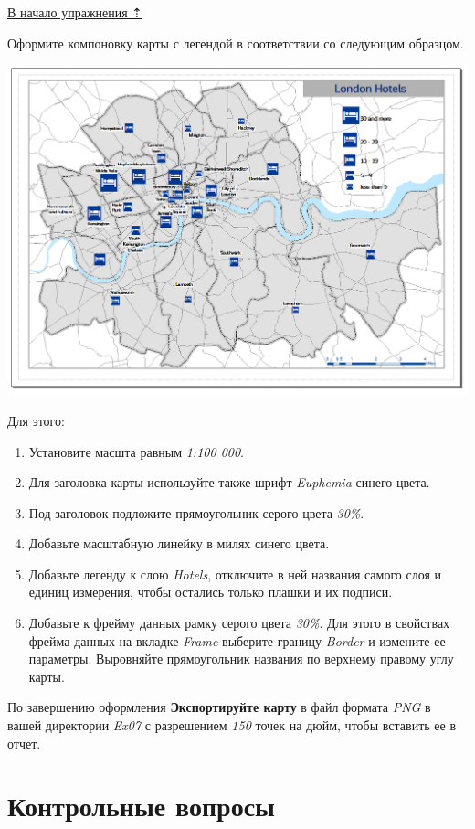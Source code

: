 \documentclass[]{book}
\theoremstyle{definition}
\theoremstyle{definition}
\theoremstyle{definition}
\theoremstyle{remark}
\begin{document}
\protect\hyperlink{map-ref-economic}{В начало упражнения ⇡}

Оформите компоновку карты с легендой в соответствии со следующим
образцом.

\includegraphics{images/Ex07/image27.png}

Для этого:

\begin{enumerate}
\def\labelenumi{\arabic{enumi}.}
\item
  Установите масшта равным \emph{1:100 000}.
\item
  Для заголовка карты используйте также шрифт \emph{Euphemia} синего
  цвета.
\item
  Под заголовок подложите прямоугольник серого цвета \emph{30\%}.
\item
  Добавьте масштабную линейку в милях синего цвета.
\item
  Добавьте легенду к слою \emph{Hotels}, отключите в ней названия самого
  слоя и единиц измерения, чтобы остались только плашки и их подписи.
\item
  Добавьте к фрейму данных рамку серого цвета \emph{30\%}. Для этого в
  свойствах фрейма данных на вкладке \emph{Frame} выберите границу
  \emph{Border} и измените ее параметры. Выровняйте прямоугольник
  названия по верхнему правому углу карты.
\end{enumerate}

По завершению оформления \textbf{Экспортируйте карту} в файл формата
\emph{PNG} в вашей директории \emph{Ex07} с разрешением \emph{150} точек
на дюйм, чтобы вставить ее в отчет.

\hypertarget{map-ref-economic-questions}{%
\section{Контрольные вопросы}\label{map-ref-economic-questions}}
\end{document}

